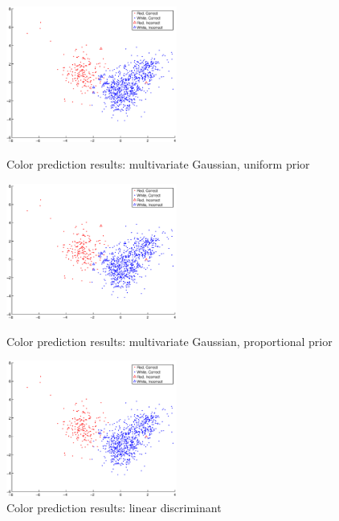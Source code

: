 \documentclass[twoside]{article}
\begin{document}
\begin{multicols}{2}
\begin{figure}[H]
\centering
\includegraphics[width=0.5\textwidth]{colorpca/gauss_noprior}
\caption{Color prediction results: multivariate Gaussian, uniform prior}
\includegraphics[width=0.5\textwidth]{colorpca/gauss_prior}
\caption{Color prediction results: multivariate Gaussian, proportional prior}
\includegraphics[width=0.5\textwidth]{colorpca/linear_discr}
\caption{Color prediction results: linear discriminant}
\end{figure}



\end{multicols}
\end{document}
